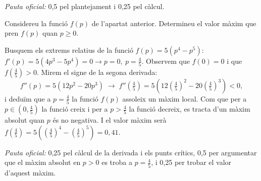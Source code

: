 \begin{apartats}
\begin{solucio}
\textit{Pauta oficial:} 0,5 pel plantejament i 0,25 pel càlcul.
\end{solucio}

Considereu la funció $f(p)$ de l'apartat anterior. Determineu el valor màxim que pren $f(p)$ quan $p\ge0$.

\begin{solucio}
Busquem els extrems relatius de la funció $f(p)=5\left(p^4-p^5\right)$:
$f'(p)=5\left(4p^3-5p^4\right)=0\rightarrow p=0,\ p=\frac45$. Observem que $f(0)=0$ i que
$f\!\left(\frac45\right)>0$. Mirem el signe de la segona derivada:
\[
f''(p)=5\left(12p^2-20p^3\right)\;\rightarrow\;f''\!\left(\tfrac45\right)
=5\left(12\left(\tfrac45\right)^2-20\left(\tfrac45\right)^3\right)<0,
\]
i deduïm que a $p=\frac45$ la funció $f(p)$ assoleix un màxim local. Com que per a $p\in\left(0,\frac45\right)$
la funció creix i per a $p>\frac45$ la funció decreix, es tracta d'un màxim absolut quan $p$ és no negativa.
I el valor màxim serà $f\!\left(\frac45\right)=5\left(\left(\frac45\right)^4-\left(\frac45\right)^5\right)=0{,}41$.

\textit{Pauta oficial:} 0,25 pel càlcul de la derivada i els punts crítics, 0,5 per argumentar que el màxim
absolut en $p>0$ es troba a $p=\frac45$, i 0,25 per trobar el valor d'aquest màxim.
\end{solucio}

\end{apartats}
